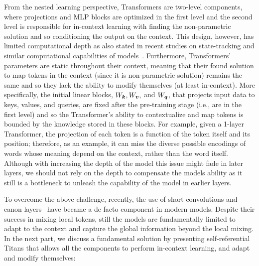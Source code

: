 {From the nested learning perspective, Transformers are two-level components, where projections and MLP blocks are optimized in the first level and the second level is responsible for in-context learning with finding the non-parametric solution and so conditioning the output on the context. This design, however, has limited computational depth as also stated in recent studies on state-tracking and similar computational capabilities of models~\citep{merrill2024the, sanford2024transformers, grazzi2025unlocking}. Furthermore, Transformers' parameters are static throughout their context, meaning that their found solution to map tokens in the context (since it is non-parametric solution) remains the same and so they lack the ability to modify themselves (at least in-context). More specifically, the initial linear blocks, $W_{\boldsymbol{k}}, W_{\boldsymbol{v}},$ and $W_{\boldsymbol{q}}$, that projects input data to keys, values, and queries, are fixed after the pre-training stage (i.e., are in the first level) and so the Transformer's ability to contextualize and map tokens is bounded by the knowledge stored in these blocks. For example, given a 1-layer Transformer, the projection of each token is a function of the token itself and its position; therefore, as an example, it can miss the diverse possible encodings of words whose meaning depend on the context, rather than the word itself. Although with increasing the depth of the model this issue might fade in later layers, we should not rely on the depth to compensate the models ability as it still is a bottleneck to unleash the capability of the model in earlier layers. 


To overcome the above challenge, recently, the use of short convolutions and canon layers~\citep{Allenzhu2025-canon} have became a de facto component in modern models. Despite their success in mixing local tokens, still the models are fundamentally limited to adapt to the context and capture the global information beyond the local mixing. In the next part, we discuss a fundamental solution by presenting self-referential Titans that allows all the components to perform in-context learning, and adapt and modify themselves:





}
